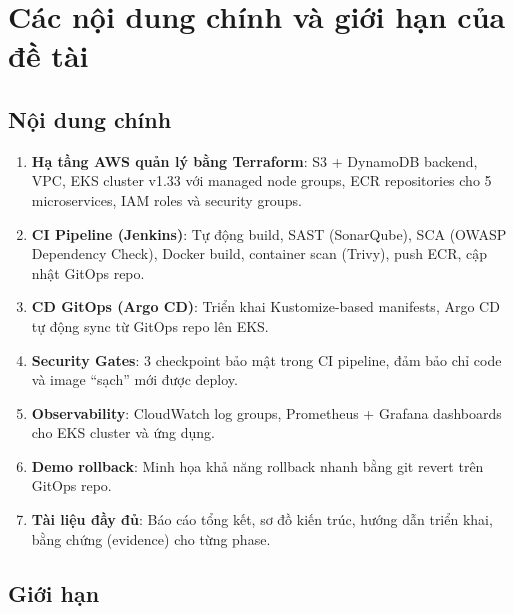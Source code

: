 \documentclass[12pt,a4paper]{article}
\begin{document}
\section{Các nội dung chính và giới hạn của đề tài}

\subsection{Nội dung chính}

\begin{enumerate}[leftmargin=*,nosep]
  \item \textbf{Hạ tầng AWS quản lý bằng Terraform}: S3 + DynamoDB backend, VPC, EKS cluster v1.33 với managed node groups, ECR repositories cho 5 microservices, IAM roles và security groups.
  \item \textbf{CI Pipeline (Jenkins)}: Tự động build, SAST (SonarQube), SCA (OWASP Dependency Check), Docker build, container scan (Trivy), push ECR, cập nhật GitOps repo.
  \item \textbf{CD GitOps (Argo CD)}: Triển khai Kustomize-based manifests, Argo CD tự động sync từ GitOps repo lên EKS.
  \item \textbf{Security Gates}: 3 checkpoint bảo mật trong CI pipeline, đảm bảo chỉ code và image ``sạch'' mới được deploy.
  \item \textbf{Observability}: CloudWatch log groups, Prometheus + Grafana dashboards cho EKS cluster và ứng dụng.
  \item \textbf{Demo rollback}: Minh họa khả năng rollback nhanh bằng git revert trên GitOps repo.
  \item \textbf{Tài liệu đầy đủ}: Báo cáo tổng kết, sơ đồ kiến trúc, hướng dẫn triển khai, bằng chứng (evidence) cho từng phase.
\end{enumerate}

\subsection{Giới hạn}
\end{document}

